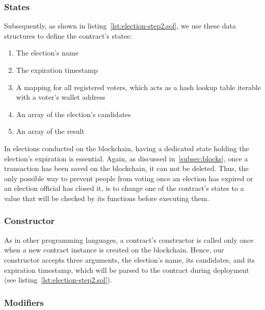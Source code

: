 
\subsubsection{States}

Subsequently, as shown in listing~\ref{lst:election-step2.sol}, we use these data structures to define the contract's states: 

\begin{enumerate}
    \item The election's name
    \item The expiration timestamp
    \item A mapping for all registered voters, which acts as a hash lookup table iterable with a voter's wallet address~\autocite[137]{antonopoulos_mastering_2019}
    \item An array of the election's candidates
    \item An array of the result
\end{enumerate}

In elections conducted on the blockchain, having a dedicated state holding the election's expiration is essential.
Again, as discussed in~\cref{subsec:blocks}, once a transaction has been saved on the blockchain, it can not be deleted.
Thus, the only possible way to prevent people from voting once an election has expired or an election official has closed it, is to change one of the contract's states to a value that will be checked by its functions before executing them.

\subsubsection{Constructor}

As in other programming languages, a contract's constructor is called only once when a new contract instance is created on the blockchain.
Hence, our constructor accepts three arguments, the election's name, its candidates, and its expiration timestamp, which will be parsed to the contract during deployment (see listing~\ref{lst:election-step2.sol}).

\subsubsection{Modifiers}

